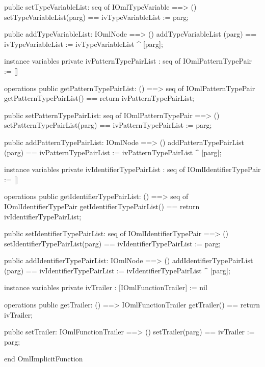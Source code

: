 \begin{vdm_al}
  public setTypeVariableList: seq of IOmlTypeVariable ==> ()
  setTypeVariableList(parg) == ivTypeVariableList := parg;

  public addTypeVariableList: IOmlNode ==> ()
  addTypeVariableList (parg) == ivTypeVariableList := ivTypeVariableList ^ [parg];

instance variables
  private ivPatternTypePairList : seq of IOmlPatternTypePair := []

operations
  public getPatternTypePairList: () ==> seq of IOmlPatternTypePair
  getPatternTypePairList() == return ivPatternTypePairList;

  public setPatternTypePairList: seq of IOmlPatternTypePair ==> ()
  setPatternTypePairList(parg) == ivPatternTypePairList := parg;

  public addPatternTypePairList: IOmlNode ==> ()
  addPatternTypePairList (parg) == ivPatternTypePairList := ivPatternTypePairList ^ [parg];

instance variables
  private ivIdentifierTypePairList : seq of IOmlIdentifierTypePair := []

operations
  public getIdentifierTypePairList: () ==> seq of IOmlIdentifierTypePair
  getIdentifierTypePairList() == return ivIdentifierTypePairList;

  public setIdentifierTypePairList: seq of IOmlIdentifierTypePair ==> ()
  setIdentifierTypePairList(parg) == ivIdentifierTypePairList := parg;

  public addIdentifierTypePairList: IOmlNode ==> ()
  addIdentifierTypePairList (parg) == ivIdentifierTypePairList := ivIdentifierTypePairList ^ [parg];

instance variables
  private ivTrailer : [IOmlFunctionTrailer] := nil

operations
  public getTrailer: () ==> IOmlFunctionTrailer
  getTrailer() == return ivTrailer;

  public setTrailer: IOmlFunctionTrailer ==> ()
  setTrailer(parg) == ivTrailer := parg;

end OmlImplicitFunction
\end{vdm_al}

